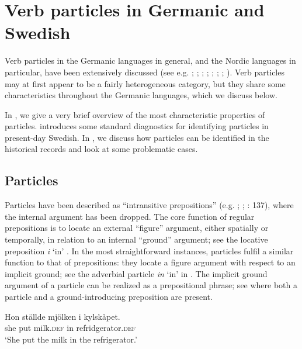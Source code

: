 \documentclass[output=paper]{langscibook}
\begin{document}
\section{Verb particles in Germanic and Swedish}\label{sec:lalu:2}


Verb particles in the Germanic languages in general, and the Nordic languages in particular, have been extensively discussed (see e.g. \citealt{Afarli1985}; \citealt{Den_dikken1995}; \citealt{Svenonius1996}; \citealt{Wurmbrand2000}; \citealt{Dehe2002}; \citealt{RamchandSvenonius2002}; \citealt{Toivonen2003}; \citealt{Aa2015}). Verb particles may at first appear to be a fairly heterogeneous category, but they share some characteristics throughout the Germanic languages, which we discuss below. 



In , we give a very brief overview of the most characteristic properties of particles.  introduces some standard diagnostics for identifying particles in present-day Swedish. In , we discuss how particles can be identified in the historical records and look at some problematic cases.


\subsection{Particles}\label{sec:lalu:2.1}

\begin{sloppypar}
Particles have been described as “intransitive prepositions” (e.g. \citealt{Emonds1976}; \citealt{Svenonius1996}; \citealt{Faarlund2019}: 137), where the internal argument has been dropped. The core function of regular prepositions is to locate an external “figure” argument, either spatially or temporally, in relation to an internal “ground” argument; see the locative preposition \textit{i} ‘in’ . In the most straightforward instances, particles fulfil a similar function to that of prepositions: they locate a figure argument with respect to an implicit ground; see the adverbial particle \textit{in} ‘in’ in . The implicit ground argument of a particle can be realized as a prepositional phrase; see  where both a particle and a ground-introducing preposition are present.
\end{sloppypar}

\ea\label{ex:lalu:3}
\ea\label{ex:lalu:3a}
\gll  Hon   ställde   mjölken     i     kylskåpet.\\
    she       put     milk\textsc{.def}   in   refridgerator.\textsc{def}\\
\glt `She put the milk in the refrigerator.'
\end{document}
